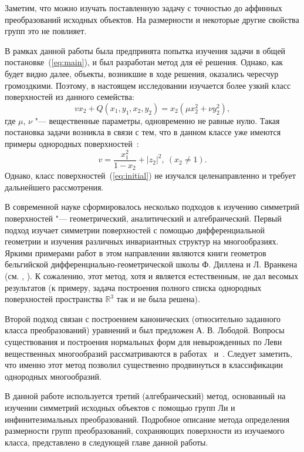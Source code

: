\documentclass[../main.tex]{subfiles}
\begin{document}
Заметим, что можно изучать поставленную задачу с точностью до аффинных преобразований исходных объектов. На размерности и некоторые другие свойства групп это не повлияет.

В рамках данной работы была предпринята попытка изучения задачи в общей постановке~(\ref{eq:main}), и был разработан метод для её решения. Однако, как будет видно далее, объекты, возникшие в ходе решения, оказались чересчур громоздкими. Поэтому, в настоящем исследовании изучается более узкий класс поверхностей из данного семейства:
\begin{equation}\label{eq:initial}
v x_2 + Q(x_1, y_1, x_2, y_2) = x_2 (\mu x_2^2 + \nu y_2^2),
\end{equation}
где $\mu$, $\nu$ "--- вещественные параметры, одновременно не равные нулю. Такая постановка задачи возникла в связи с тем, что в данном классе уже имеются примеры однородных поверхностей~\cite{ALS}:
\begin{equation}\label{eq:homogenous}
v = \frac{x_1^2}{1 - x_2} + |z_2|^2,\ (x_2 \ne 1).
\end{equation}
Однако, класс поверхностей~(\ref{eq:initial}) не изучался целенаправленно и требует дальнейшего рассмотрения.

В современной науке сформировалось несколько подходов к изучению симметрий поверхностей "--- геометрический, аналитический и алгебраический. Первый подход изучает симметрии поверхностей с помощью дифференциальной геометрии и изучения различных инвариантных структур на многообразиях. Яркими примерами работ в этом направлении являются книги геометров бельгийской дифференциально-геометрической школы Ф. Диллена и Л. Вранкена (см. \cite{dillen}, \cite{vrancken}). К сожалению, этот метод, хотя и является естественным, не дал весомых результатов (к примеру, задача построения полного списка однородных поверхностей пространства $\mathbb{R}^3$ так и не была решена).

Второй подход связан с построением канонических (относительно заданного класса преобразований) уравнений и был предложен А. В. Лободой. Вопросы существования и построения нормальных форм для невырожденных по Леви вещественных многообразий рассматриваются в работах~\cite{loboda_hodarev} и~\cite{danilov}. Следует заметить, что именно этот метод позволил существенно продвинуться в классификации однородных многообразий.

В данной работе используется третий (алгебраический) метод, основанный на изучении симметрий исходных объектов с помощью групп Ли и инфинитезимальных преобразований. Подробное описание метода определения размерности групп преобразований, сохраняющих поверхности из изучаемого класса, представлено в следующей главе данной работы.
\end{document}
